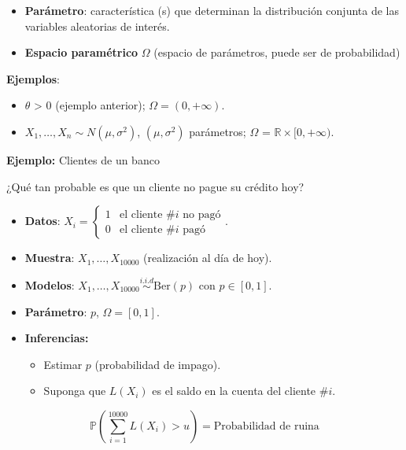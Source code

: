 \documentclass[
  12pt,
]{book}
\providecommand{\tightlist}{%
  \setlength{\itemsep}{0pt}\setlength{\parskip}{0pt}}
\begin{document}
\begin{itemize}
\item
  \textbf{Parámetro}: característica (s) que determinan la distribución conjunta de las variables aleatorias de interés.
\item
  \textbf{Espacio paramétrico} \(\Omega\) (espacio de parámetros, puede ser de probabilidad)
\end{itemize}

\textbf{Ejemplos}:

\begin{itemize}
\tightlist
\item
  \(\theta\) \textgreater{} 0 (ejemplo anterior); \(\Omega = (0,+\infty)\).
\item
  \(X_1,\dots,X_n \sim N(\mu, \sigma^2)\), \((\mu,\sigma^2)\) parámetros; \(\Omega\) = \(\mathbb{R}\times[0,+\infty)\).
\end{itemize}

\textbf{Ejemplo:} Clientes de un banco

¿Qué tan probable es que un cliente no pague su crédito hoy?

\begin{itemize}
\item
  \textbf{Datos}: \(X_i = \begin{cases}1& \text{el cliente } \#i \text{ no pagó}\\0 & \text{el cliente } \#i \text{ pagó}\end{cases}\).
\item
  \textbf{Muestra}: \(X_1,\dots,X_{10000}\) (realización al día de hoy).
\item
  \textbf{Modelos}: \(X_1,\dots, X_{10000} \stackrel{i.i.d}{\sim} \text{Ber}(p)\) con \(p\in[0,1]\).
\item
  \textbf{Parámetro}: \(p\), \(\Omega = [0,1]\).
\item
  \textbf{Inferencias:}

  \begin{itemize}
  \tightlist
  \item
    Estimar \(p\) (probabilidad de impago).
  \item
    Suponga que \(L(X_i)\) es el saldo en la cuenta del cliente \(\#i\).
  \end{itemize}
\end{itemize}

\begin{equation*}
\mathbb{P}\left(\sum_{i=1}^{10000}L(X_i)>u\right)=\text{Probabilidad de ruina}
\end{equation*}
\end{document}
